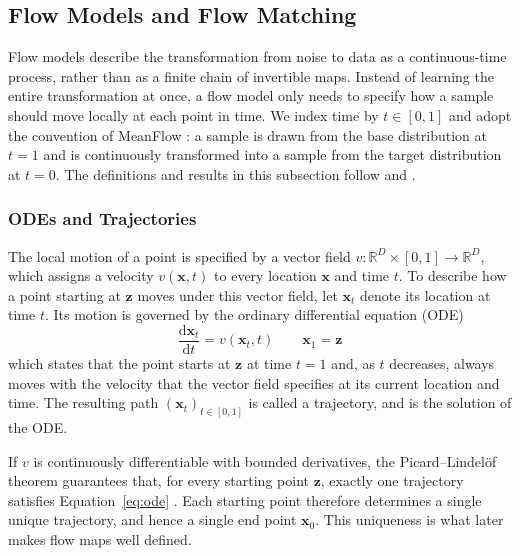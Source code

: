 \documentclass[12pt,a4paper]{report}
\begin{document}
\subsection{Flow Models and Flow Matching}
\label{subsec:flow_models_and_flow_matching}
Flow models describe the transformation from noise to data as a continuous-time process, rather than as a finite chain of invertible maps. Instead of learning the entire transformation at once, a flow model only needs to specify how a sample should move locally at each point in time. We index time by $t\in[0,1]$ and adopt the convention of MeanFlow \parencite{geng2025meanflowsonestepgenerative}: a sample is drawn from the base distribution at $t=1$ and is continuously transformed into a sample from the target distribution at $t=0$. The definitions and results in this subsection follow \textcite{mit_FM} and \textcite{lipman_FM}.

\subsubsection{ODEs and Trajectories}
\label{subsubsec:odes_and_trajectories}
The local motion of a point is specified by a vector field $v:\mathbb{R}^{D}\times[0,1]\to\mathbb{R}^{D}$, which assigns a velocity $v(\mathbf{x},t)$ to every location $\mathbf{x}$ and time $t$. To describe how a point starting at $\mathbf{z}$ moves under this vector field, let $\mathbf{x}_t$ denote its location at time $t$. Its motion is governed by the ordinary differential equation (ODE)
\begin{equation}
\frac{\mathrm{d}\mathbf{x}_t}{\mathrm{d}t}
=
v(\mathbf{x}_t,t)
\qquad
\mathbf{x}_1=\mathbf{z}
\label{eq:ode}
\end{equation}
which states that the point starts at $\mathbf{z}$ at time $t=1$ and, as $t$ decreases, always moves with the velocity that the vector field specifies at its current location and time. The resulting path $(\mathbf{x}_t)_{t\in[0,1]}$ is called a trajectory, and is the solution of the ODE.

If $v$ is continuously differentiable with bounded derivatives, the Picard--Lindel\"of theorem guarantees that, for every starting point $\mathbf{z}$, exactly one trajectory satisfies Equation~\ref{eq:ode} \parencite{mit_FM}. Each starting point therefore determines a single unique trajectory, and hence a single end point $\mathbf{x}_0$. This uniqueness is what later makes flow maps well defined.
\end{document}
